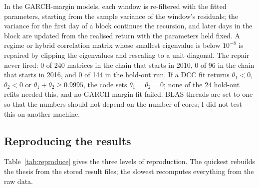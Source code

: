 In the GARCH-margin models, each window is re-filtered with the fitted parameters, starting from the sample variance of the window's residuals; the variance for the first day of a block continues the recursion, and later days in the block are updated from the realised return with the parameters held fixed. A regime or hybrid correlation matrix whose smallest eigenvalue is below $10^{-8}$ is repaired by clipping the eigenvalues and rescaling to a unit diagonal. The repair never fired: 0 of 240 matrices in the chain that starts in 2010, 0 of 96 in the chain that starts in 2016, and 0 of 144 in the hold-out run. If a DCC fit returns $\theta_1<0$, $\theta_2<0$ or $\theta_1+\theta_2\ge0.9995$, the code sets $\theta_1=\theta_2=0$; none of the 24 hold-out refits needed this, and no GARCH margin fit failed. BLAS threads are set to one so that the numbers should not depend on the number of cores; I did not test this on another machine.

\subsection{Reproducing the results}\label{sec:code-reproduce}

Table~\ref{tab:reproduce} gives the three levels of reproduction. The quickest rebuilds the thesis from the stored result files; the slowest recomputes everything from the raw data.


